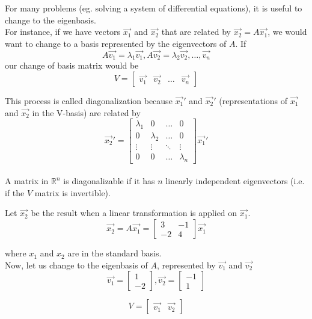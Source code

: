 \begin{enumerate}
\begin{adjustwidth}{-20pt}{0pt}
For many problems (eg. solving a system of differential equations), it is useful to change to the eigenbasis. \\
For instance, if we have vectors $\vec{x_1}$ and $\vec{x_2}$ that are related by $\vec{x_2} = A \vec{x_1}$, we would want to change to a basis represented by the eigenvectors of $A$.
If $$A \vec{v_1} = \lambda_1 \vec{v_1}, A \vec{v_2} = \lambda_2 \vec{v_2}, \dots, \vec{v_n} $$
our change of basis matrix would be
$$ V =
\begin{bmatrix}
\vec{v_1} & \vec{v_2} & \dots & \vec{v_n}
\end{bmatrix}
$$

This process is called diagonalization because $\vec{x_1}'$ and $\vec{x_2}'$ (representations of $\vec{x_1}$ and $\vec{x_2}$ in the V-basis) are related by
$$ \vec{x_2}' = 
\begin{bmatrix}
\lambda_1 & 0 & \dots & 0 \\
0 & \lambda_2 & \dots & 0 \\
\vdots & \vdots & \ddots & \vdots \\
0 & 0 & \dots & \lambda_n
\end{bmatrix} \vec{x_1}'
$$ \\
A matrix in $\mathbb{R}^{n}$ is diagonalizable if it has $n$ linearly independent eigenvectors (i.e. if the $V$ matrix is invertible).

\end{adjustwidth}

\bigskip

\qitem Let $\vec{x_2}$ be the result when a linear transformation is applied on $\vec{x_1}$.
$$\vec{x_2} = A \vec{x_1} = 
\begin{bmatrix}
3 & -1 \\
-2 & 4
\end{bmatrix}
\vec{x_1}
$$

where $x_1$ and $x_2$ are in the standard basis. \\
Now, let us change to the eigenbasis of $A$, represented by $\vec{v_1}$ and $\vec{v_2}$
$$
\vec{v_1} = 
\begin{bmatrix}
1 \\
-2
\end{bmatrix}, 
\vec{v_2} =
\begin{bmatrix}
-1 \\
1
\end{bmatrix}
$$

$$ V =
\begin{bmatrix}
\vec{v_1} & \vec{v_2}
\end{bmatrix}
$$


\end{enumerate}
